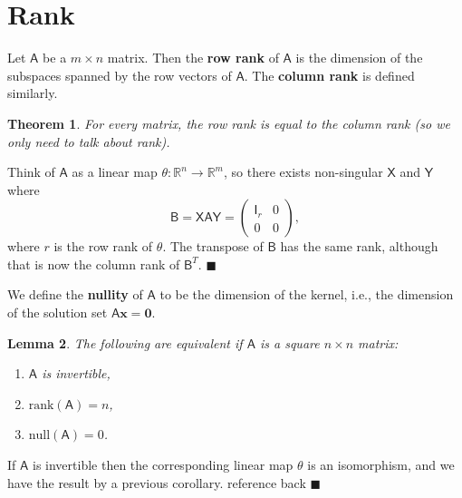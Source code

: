 \documentclass[letter-paper]{tufte-book}
\newtheorem{theorem}{\color{pastel-blue}Theorem}[section]
\newtheorem{lemma}[theorem]{\color{pastel-blue}Lemma}
\newenvironment{proof}[1][Proof]{\begin{trivlist}
\item[\hskip \labelsep {\bfseries #1}]}{\end{trivlist}}
\newcommand{\As}{{\mathsf{A}}}
\newcommand{\Bs}{{\mathsf{B}}}
\newcommand{\Is}{{\mathsf{I}}}
\newcommand{\Xs}{{\mathsf{X}}}
\newcommand{\Ys}{{\mathsf{Y}}}
\newcommand{\Ob}{{\boldsymbol{0}}}
\newcommand{\xb}{{\boldsymbol{x}}}
\newcommand{\qed}{\hfill$\blacksquare$}
\begin{document}

\section{Rank}

Let $\As$ be a $m\times n$ matrix. Then the \textbf{row rank} of $\As$ is the
dimension of the subspaces spanned by the row vectors of $\As$. The
\textbf{column rank} is defined similarly.

\begin{theorem}
  For every matrix, the row rank is equal to the column rank (so we only need to
  talk about \emph{rank}).
\end{theorem}

\begin{proof}
  Think of $\As$ as a linear map $\theta: \mathbb{R}^n \to \mathbb{R}^m$, so
  there exists non-singular $\Xs$ and $\Ys$ where
  \begin{equation*}
    \Bs = \Xs \As \Ys = \begin{pmatrix}\Is_r & 0 \\ 0 & 0 \end{pmatrix},
  \end{equation*}
  where $r$ is the row rank of $\theta$. The transpose of $\Bs$ has the same
  rank, although that is now the column rank of $\Bs^T$. \qed
\end{proof}

We define the \textbf{nullity} of $\As$ to be the dimension of the kernel, i.e.,
the dimension of the solution set $\As\xb = \Ob$.

\begin{lemma}
  The following are equivalent if $\As$ is a square $n\times n$ matrix:
  \begin{enumerate}
    \item $\As$ is invertible,
    \item $\mbox{rank}(\As) = n$,
    \item $\mbox{null}(\As) = 0$.
  \end{enumerate}
\end{lemma}

\begin{proof}
  If $\As$ is invertible then the corresponding linear map $\theta$ is an
  isomorphism, and we have the result by a previous corollary.
  {\color{red}reference back} \qed
\end{proof}

\end{document}
